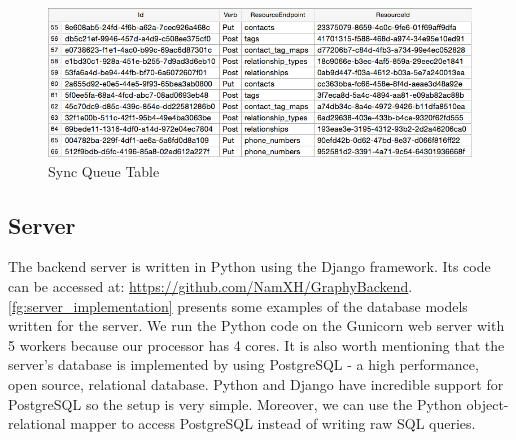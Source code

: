 \begin{figure}[!h]
\begin{centering}
\includegraphics[scale=0.63]{pics/sync_queue.png}
\caption{Sync Queue Table}\label{fg:sync_queue}
\end{centering}
\end{figure}

\subsection{Server}
The backend server is written in Python using the Django framework. Its code can be accessed at: \url{https://github.com/NamXH/GraphyBackend}. \autoref{fg:server_implementation} presents some examples of the database models written for the server. We run the Python code on the Gunicorn web server with 5 workers because our processor has 4 cores. It is also worth mentioning that the server's database is implemented by using PostgreSQL - a high performance, open source, relational database. Python and Django have incredible support for PostgreSQL so the setup is very simple. Moreover, we can use the Python object-relational mapper to access PostgreSQL instead of writing raw SQL queries.

